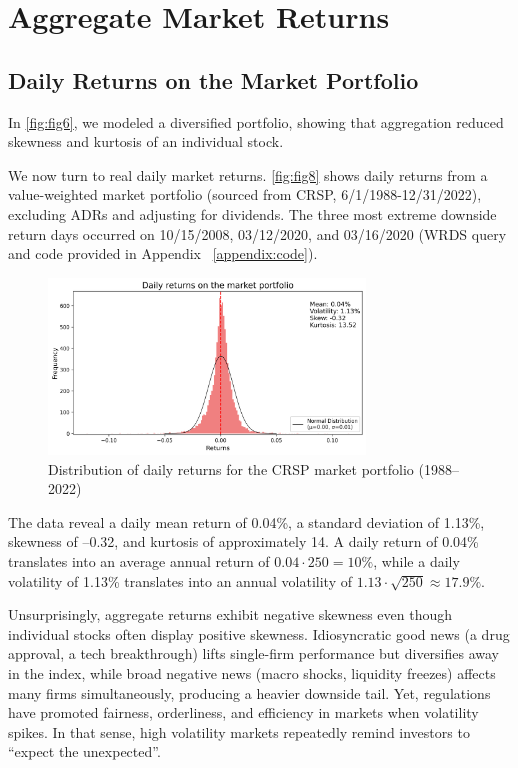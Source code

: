 \section{Aggregate Market Returns}

\subsection{Daily Returns on the Market Portfolio}
In \autoref{fig:fig6}, we modeled a diversified portfolio, showing that aggregation reduced skewness and kurtosis of an individual stock. 

We now turn to real daily market returns. \autoref{fig:fig8} shows daily returns from a value-weighted market portfolio (sourced from CRSP, 6/1/1988-12/31/2022), excluding ADRs and adjusting for dividends. The three most extreme downside return days occurred on 10/15/2008, 03/12/2020, and 03/16/2020 (WRDS query and code provided in Appendix ~\ref{appendix:code}). 

\begin{figure}[h]
    \centering
    \includegraphics[width=0.75\textwidth]{fig8.png}
    \caption{Distribution of daily returns for the CRSP market portfolio (1988–2022)}
    \label{fig:fig8}
\end{figure}

The data reveal a daily mean return of 0.04\%, a standard deviation of 1.13\%, skewness of –0.32, and kurtosis of approximately 14. A daily return of 0.04\% translates into an average annual return of $0.04 \cdot 250 =  10\%$, while a daily volatility of 1.13\% translates into an annual volatility of $1.13 \cdot \sqrt{250} \approx 17.9\%$.

Unsurprisingly, aggregate returns exhibit negative skewness even though individual stocks often display positive skewness. Idiosyncratic good news (a drug approval, a tech breakthrough) lifts single-firm performance but diversifies away in the index, while broad negative news (macro shocks, liquidity freezes) affects many firms simultaneously, producing a heavier downside tail. Yet, regulations have promoted fairness, orderliness, and efficiency in markets when volatility spikes. In that sense, high volatility markets repeatedly remind investors to “expect the unexpected”.

